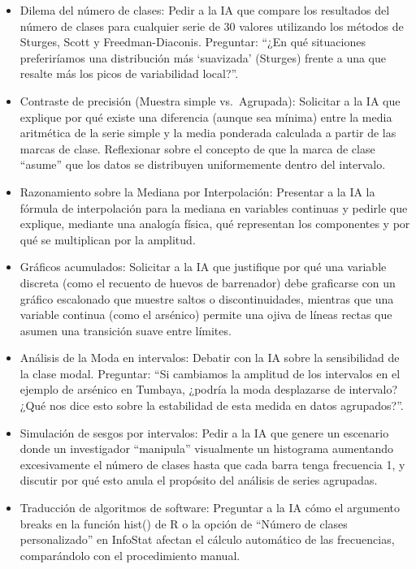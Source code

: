 \documentclass[
  spanish,
  letterpaper,
  DIV=11,
  numbers=noendperiod]{scrreprt}
\providecommand{\tightlist}{%
  \setlength{\itemsep}{0pt}\setlength{\parskip}{0pt}}
\begin{document}
\begin{tcolorbox}[enhanced jigsaw, arc=.35mm, bottomrule=.15mm, bottomtitle=1mm, breakable, colback=white, colbacktitle=quarto-callout-tip-color!10!white, colframe=quarto-callout-tip-color-frame, coltitle=black, left=2mm, leftrule=.75mm, opacityback=0, opacitybacktitle=0.6, rightrule=.15mm, title=\textcolor{quarto-callout-tip-color}{\faLightbulb}\hspace{0.5em}{Estrategias de interacción con la IA}, titlerule=0mm, toprule=.15mm, toptitle=1mm]

\begin{itemize}
\tightlist
\item
  Dilema del número de clases: Pedir a la IA que compare los resultados
  del número de clases para cualquier serie de 30 valores utilizando los
  métodos de Sturges, Scott y Freedman-Diaconis. Preguntar: ``¿En qué
  situaciones preferiríamos una distribución más `suavizada' (Sturges)
  frente a una que resalte más los picos de variabilidad local?''.
\item
  Contraste de precisión (Muestra simple vs.~Agrupada): Solicitar a la
  IA que explique por qué existe una diferencia (aunque sea mínima)
  entre la media aritmética de la serie simple y la media ponderada
  calculada a partir de las marcas de clase. Reflexionar sobre el
  concepto de que la marca de clase ``asume'' que los datos se
  distribuyen uniformemente dentro del intervalo.
\item
  Razonamiento sobre la Mediana por Interpolación: Presentar a la IA la
  fórmula de interpolación para la mediana en variables continuas y
  pedirle que explique, mediante una analogía física, qué representan
  los componentes y por qué se multiplican por la amplitud.
\item
  Gráficos acumulados: Solicitar a la IA que justifique por qué una
  variable discreta (como el recuento de huevos de barrenador) debe
  graficarse con un gráfico escalonado que muestre saltos o
  discontinuidades, mientras que una variable continua (como el
  arsénico) permite una ojiva de líneas rectas que asumen una transición
  suave entre límites.
\item
  Análisis de la Moda en intervalos: Debatir con la IA sobre la
  sensibilidad de la clase modal. Preguntar: ``Si cambiamos la amplitud
  de los intervalos en el ejemplo de arsénico en Tumbaya, ¿podría la
  moda desplazarse de intervalo? ¿Qué nos dice esto sobre la estabilidad
  de esta medida en datos agrupados?''.
\item
  Simulación de sesgos por intervalos: Pedir a la IA que genere un
  escenario donde un investigador ``manipula'' visualmente un histograma
  aumentando excesivamente el número de clases hasta que cada barra
  tenga frecuencia 1, y discutir por qué esto anula el propósito del
  análisis de series agrupadas.
\item
  Traducción de algoritmos de software: Preguntar a la IA cómo el
  argumento breaks en la función hist() de R o la opción de ``Número de
  clases personalizado'' en InfoStat afectan el cálculo automático de
  las frecuencias, comparándolo con el procedimiento manual.
\end{itemize}


\end{tcolorbox}
\end{document}

